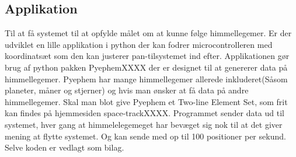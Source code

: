 \subsection{Applikation}
Til at få systemet til at opfylde målet om at kunne følge himmellegemer. Er der udviklet en lille applikation i python der kan fodrer microcontrolleren med koordinatsæt som den kan justerer pan-tilsystemet ind efter. Applikationen gør brug af python pakken Pyephem\cite{Pyephem}XXXX der er designet til at genererer data på himmellegemer. Pyephem har mange himmellegemer allerede inkluderet(Såsom planeter, måner og stjerner) og hvis man ønsker at få data på andre himmellegemer. Skal man blot give Pyephem et Two-line Element Set, som frit kan findes på hjemmesiden space-track\cite{https://www.space-track.org}XXXX. Programmet sender data ud til systemet, hver gang at himmelelegemeget har bevæget sig nok til at det giver mening at flytte systemet. Og kan sende med op til 100 positioner per sekund. Selve koden er vedlagt som bilag.